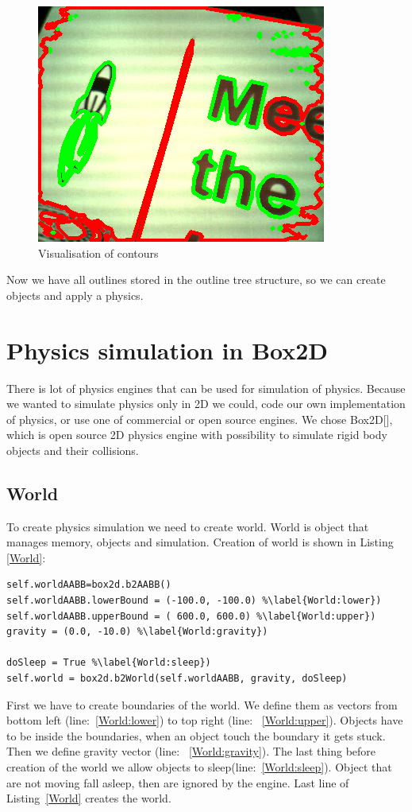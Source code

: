 \documentclass{ifacconf}
\begin{document}
\begin{figure}[h]
\center
\includegraphics[width=0.8\columnwidth]{images/5test-contours.png}
\caption{Visualisation of contours}
\label{fig:contours}
\end{figure}

Now we have all outlines stored in the outline tree structure, so we can create
objects and apply a physics.

\section{Physics simulation in Box2D}
There is lot of physics engines that can be used for simulation of physics.
Because we wanted to simulate physics only in 2D we could, code our own
implementation of physics, or use one of commercial or open source engines. We
chose Box2D[\cite{GameEngines}], which is open source 2D physics engine with
possibility to simulate rigid body objects and their collisions.
\subsection{World}
To create physics simulation we need to create world. World is object that
manages memory, objects and simulation. Creation of world is shown in Listing
\ref{World}:
\begin{lstlisting}[caption=Creation of Box2D world,label=World]
self.worldAABB=box2d.b2AABB()
self.worldAABB.lowerBound = (-100.0, -100.0) %\label{World:lower})
self.worldAABB.upperBound = ( 600.0, 600.0)	%\label{World:upper})
gravity = (0.0, -10.0) %\label{World:gravity})

doSleep = True %\label{World:sleep})
self.world = box2d.b2World(self.worldAABB, gravity, doSleep)
\end{lstlisting}
First we have to create boundaries of the world. We define them as vectors from
bottom left (line:~\ref{World:lower}) to top right (line:~
\ref{World:upper}). Objects have to be inside the boundaries, when an object
touch the boundary it gets stuck. Then we define gravity vector (line:~
\ref{World:gravity}). The last thing before creation of the world we allow
objects to sleep(line:~\ref{World:sleep}). Object that are not moving fall
asleep, then are ignored by the engine. Last line of Listing~\ref{World} creates
the world.
\end{document}
